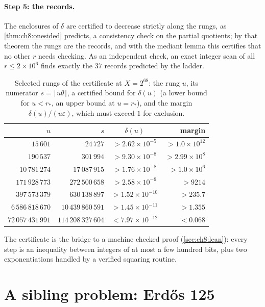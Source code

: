 \paragraph{Step 5: the records.} The enclosures of $\delta$ are certified to
decrease strictly along the rungs, as \cref{thm:ch8:onesided} predicts, a consistency check on the partial quotients; by that theorem the rungs are the records, and with the mediant lemma this certifies that no other $r$
needs checking. As an independent check, an exact integer scan of all
$r\le2\times10^6$ finds exactly the $37$ records predicted by the ladder.

\begin{table}[ht]
\centering\small
\caption{Selected rungs of the certificate at $X=2^{68}$: the rung $u$, its
numerator $s=\lceil u\theta\rceil$, a certified bound for $\delta(u)$ (a lower bound for $u<r_*$, an upper bound at $u=r_*$),
and the margin $\delta(u)/(u\varepsilon)$, which must exceed $1$ for
exclusion.}
\label{tab:ch8:certificate}
\begin{tabular}{@{}rrcr@{}}
\toprule
$u$ & $s$ & $\delta(u)$ & margin \\
\midrule
$15\,601$ & $24\,727$ & $>2.62\times10^{-5}$ & $>1.0\times10^{12}$ \\
$190\,537$ & $301\,994$ & $>9.30\times10^{-8}$ & $>2.99\times10^{8}$ \\
$10\,781\,274$ & $17\,087\,915$ & $>1.76\times10^{-8}$ & $>1.0\times10^{6}$ \\
$171\,928\,773$ & $272\,500\,658$ & $>2.58\times10^{-9}$ & $>9214$ \\
$397\,573\,379$ & $630\,138\,897$ & $>1.52\times10^{-10}$ & $>235.7$ \\
$6\,586\,818\,670$ & $10\,439\,860\,591$ & $>1.45\times10^{-11}$ & $>1.355$ \\
$72\,057\,431\,991$ & $114\,208\,327\,604$ & $<7.97\times10^{-12}$ & $<0.068$ \\
\bottomrule
\end{tabular}
\end{table}

The certificate is the bridge to a machine checked proof
(\cref{sec:ch8:lean}): every step is an inequality between integers of at
most a few hundred bits, plus two exponentiations handled by a verified
squaring routine.

\section{A sibling problem: Erd\H{o}s 125}\label{sec:ch8:erdos}

